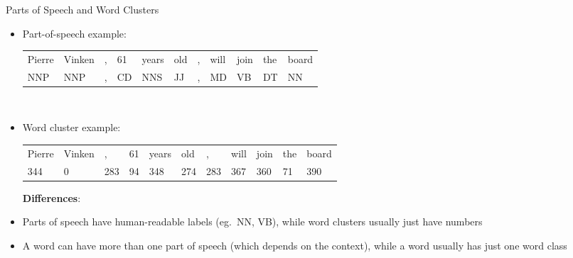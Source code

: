 \documentclass[xcolor=pdftex,x11names,table,hyperref]{beamer}
\begin{document}
\begin{frame}{Parts of Speech and Word Clusters}
\begin{itemize}
	\item Part-of-speech example: \\[0.7em]
		\begin{scriptsize}
		\begin{tabular}{lllllllllll}
			Pierre & Vinken & , & 61 & years & old & , & will & join & the & board \\
			NNP & NNP & , & CD & NNS & JJ & , & MD & VB & DT & NN \\
		\end{tabular}
	\end{scriptsize} \\[1.0em]

	\item Word cluster example: \\[0.7em]
		\begin{scriptsize}
		\begin{tabular}{lllllllllll}
			Pierre & Vinken & , & 61 & years & old & , & will & join & the & board \\
			344 & 0 & 283 & 94 & 348 & 274 & 283 & 367 & 360 & 71 & 390 \\[0.8em]
		\end{tabular}
		\end{scriptsize}
	\pause
	\hspace*{-1.5em}\textbf{Differences}:
	\item Parts of speech have human-readable labels (eg.\ NN, VB), while word clusters usually just have numbers
	\item A word can have more than one part of speech (which depends on the context), while a word usually has just one word class
\end{itemize}
\end{frame}
\end{document}
